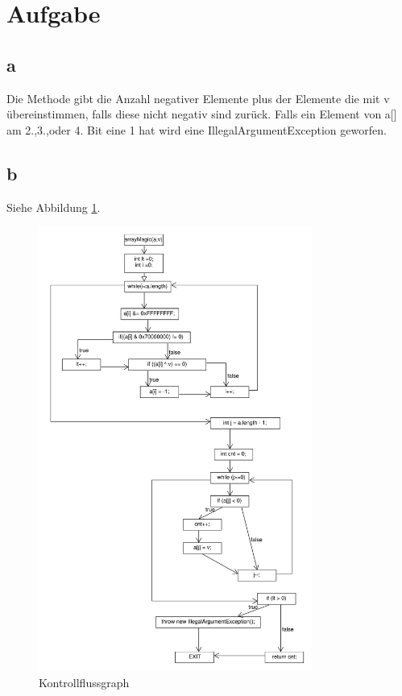 \chapter*{Aufgabe }
\section*{a}
Die Methode gibt die Anzahl negativer Elemente plus der Elemente die mit v übereinstimmen, falls diese nicht negativ sind zurück. Falls ein Element von a[] am 2.,3.,oder 4. Bit eine 1 hat wird eine IllegalArgumentException geworfen.

\section*{b}
Siehe Abbildung \ref{fig:flowChart}.
\begin{figure}[h]
	\centering
	\includegraphics[width=0.8\textwidth, clip]{FlowChart.pdf}
	\caption{Kontrollflussgraph}
	\label{fig:flowChart}
\end{figure}
